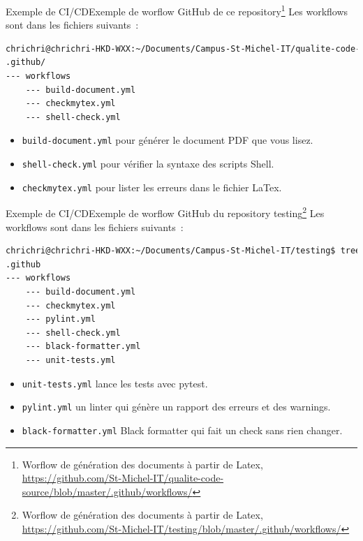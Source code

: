 \documentclass{beamer}
\begin{document}
    \begin{frame}[fragile]{Exemple de CI/CD}{Exemple de worflow GitHub de ce repository{\footnote{Worflow de génération des documents à partir de Latex, \url{https://github.com/St-Michel-IT/qualite-code-source/blob/master/.github/workflows/}}}}
        \transdissolve
        Les workflows sont dans les fichiers suivants~:
        \begin{lstlisting}[language=sh]
chrichri@chrichri-HKD-WXX:~/Documents/Campus-St-Michel-IT/qualite-code-source$ tree .github/
.github/
--- workflows
    --- build-document.yml
    --- checkmytex.yml
    --- shell-check.yml
        \end{lstlisting}
        \begin{itemize}
            \item \lstinline{build-document.yml} pour générer le document PDF que vous lisez.
            \item \lstinline{shell-check.yml} pour vérifier la syntaxe des scripts Shell.
            \item \lstinline{checkmytex.yml} pour lister les erreurs dans le fichier LaTex.
        \end{itemize}
    \end{frame}

    \begin{frame}[fragile]{Exemple de CI/CD}{Exemple de worflow GitHub du repository testing{\footnote{Worflow de génération des documents à partir de Latex, \url{https://github.com/St-Michel-IT/testing/blob/master/.github/workflows/}}}}
        \transdissolve
        Les workflows sont dans les fichiers suivants~:
        \begin{lstlisting}[language=sh]
chrichri@chrichri-HKD-WXX:~/Documents/Campus-St-Michel-IT/testing$ tree .github
.github
--- workflows
    --- build-document.yml
    --- checkmytex.yml
    --- pylint.yml
    --- shell-check.yml
    --- black-formatter.yml
    --- unit-tests.yml
        \end{lstlisting}
        \begin{itemize}
            \item \lstinline{unit-tests.yml} lance les tests avec pytest.
            \item \lstinline{pylint.yml} un linter qui génère un rapport des erreurs et des warnings.
            \item \lstinline{black-formatter.yml} Black formatter qui fait un check sans rien changer.
        \end{itemize}
    \end{frame}
\end{document}

